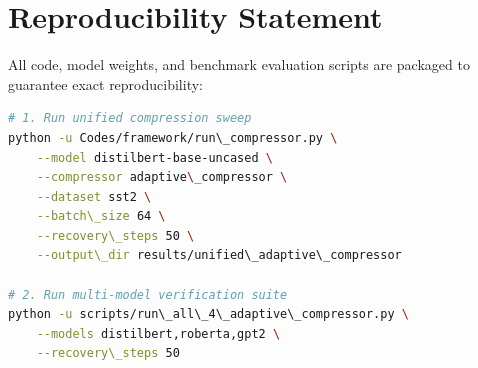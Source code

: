 \section{Reproducibility Statement}
All code, model weights, and benchmark evaluation scripts are packaged to guarantee exact reproducibility:
\begin{lstlisting}[language=bash]
# 1. Run unified compression sweep
python -u Codes/framework/run\_compressor.py \
    --model distilbert-base-uncased \
    --compressor adaptive\_compressor \
    --dataset sst2 \
    --batch\_size 64 \
    --recovery\_steps 50 \
    --output\_dir results/unified\_adaptive\_compressor

# 2. Run multi-model verification suite
python -u scripts/run\_all\_4\_adaptive\_compressor.py \
    --models distilbert,roberta,gpt2 \
    --recovery\_steps 50
\end{lstlisting}
